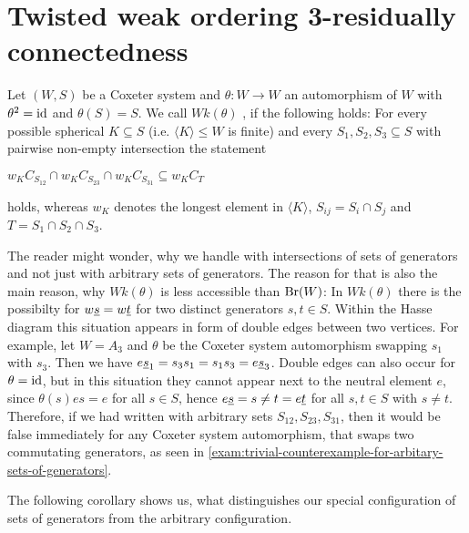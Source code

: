 \chapter{Twisted weak ordering 3-residually connectedness}
\label{sec:main-thesis}

\begin{defi}
	Let $(W,S)$ be a Coxeter system and $\theta : W \to W$ an automorphism of $W$ with $\theta^2 = \operatorname{id}$ and $\theta(S) = S$. We call $Wk(\theta)$ , if the following holds: For every possible spherical $K \subseteq S$ (i.e. $\langle K \rangle \leq W$ is finite) and every $S_1,S_2,S_3 \subseteq S$ with pairwise non-empty intersection the statement
	\begin{axioms}
		 $w_K C_{S_{12}} \cap w_K C_{S_{23}} \cap w_K C_{S_{31}} \subseteq w_K C_T$
	\end{axioms}
	holds, whereas $w_K$ denotes the longest element in $\langle K \rangle$, $S_{ij} = S_i \cap S_j$ and $T = S_1 \cap S_2 \cap S_3$.
\end{defi}

The reader might wonder, why we handle with intersections of sets of generators and not just with arbitrary sets of generators. The reason for that is also the main reason, why $Wk(\theta)$ is less accessible than $\operatorname{Br}(W)$: In $Wk(\theta)$ there is the possibilty for $w \underline{s} = w \underline{t}$ for two distinct generators $s,t \in S$. Within the Hasse diagram this situation appears in form of double edges between two vertices. For example, let $W = A_3$ and $\theta$ be the Coxeter system automorphism swapping $s_1$ with $s_3$. Then we have $e \underline{s}_1 = s_3 s_1 = s_1 s_3 = e \underline{s}_3$. Double edges can also occur for $\theta = \operatorname{id}$, but in this situation they cannot appear next to the neutral element $e$, since $\theta(s)es = e$ for all $s \in S$, hence $e \underline{s} = s \neq t = e \underline{t}$ for all $s,t \in S$ with $s \neq t$. Therefore, if we had written  with arbitrary sets $S_{12},S_{23},S_{31}$, then it would be false immediately for any Coxeter system automorphism, that swaps two commutating generators, as seen in \ref{exam:trivial-counterexample-for-arbitary-sets-of-generators}.

The following corollary shows us, what distinguishes our special configuration of sets of generators from the arbitrary configuration.

